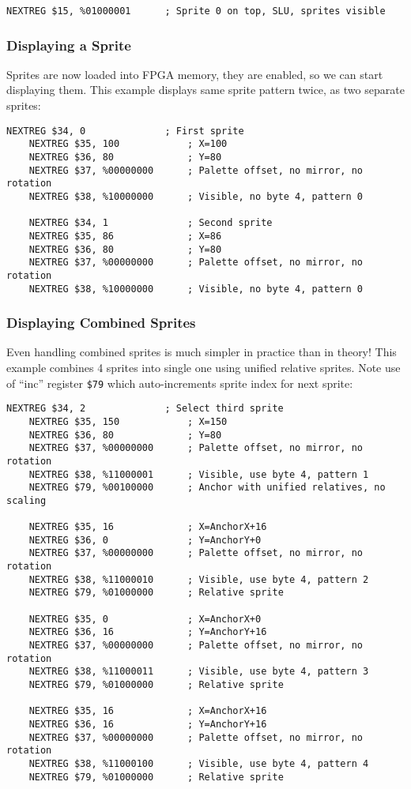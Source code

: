 \documentclass[12pt,twoside,openright,a4paper]{book}
\begin{document}
\begin{Verbatim}[gobble=1]
	NEXTREG $15, %01000001		; Sprite 0 on top, SLU, sprites visible
\end{Verbatim}


\subsubsection{Displaying a Sprite}

Sprites are now loaded into FPGA memory, they are enabled, so we can start displaying them. This example displays same sprite pattern twice, as two separate sprites:

\begin{Verbatim}[gobble=1]
	NEXTREG $34, 0              ; First sprite
	NEXTREG $35, 100            ; X=100
	NEXTREG $36, 80             ; Y=80
	NEXTREG $37, %00000000      ; Palette offset, no mirror, no rotation
	NEXTREG $38, %10000000      ; Visible, no byte 4, pattern 0

	NEXTREG $34, 1              ; Second sprite
	NEXTREG $35, 86             ; X=86
	NEXTREG $36, 80             ; Y=80
	NEXTREG $37, %00000000      ; Palette offset, no mirror, no rotation
	NEXTREG $38, %10000000      ; Visible, no byte 4, pattern 0
\end{Verbatim}


\pagebreak
\subsubsection{Displaying Combined Sprites}

Even handling combined sprites is much simpler in practice than in theory! This example combines 4 sprites into single one using unified relative sprites. Note use of ``inc'' register {\tt \$79} which auto-increments sprite index for next sprite:

\begin{Verbatim}[gobble=1]
	NEXTREG $34, 2              ; Select third sprite
	NEXTREG $35, 150            ; X=150
	NEXTREG $36, 80             ; Y=80
	NEXTREG $37, %00000000      ; Palette offset, no mirror, no rotation
	NEXTREG $38, %11000001      ; Visible, use byte 4, pattern 1
	NEXTREG $79, %00100000      ; Anchor with unified relatives, no scaling

	NEXTREG $35, 16             ; X=AnchorX+16
	NEXTREG $36, 0              ; Y=AnchorY+0
	NEXTREG $37, %00000000      ; Palette offset, no mirror, no rotation
	NEXTREG $38, %11000010      ; Visible, use byte 4, pattern 2
	NEXTREG $79, %01000000      ; Relative sprite

	NEXTREG $35, 0              ; X=AnchorX+0
	NEXTREG $36, 16             ; Y=AnchorY+16
	NEXTREG $37, %00000000      ; Palette offset, no mirror, no rotation
	NEXTREG $38, %11000011      ; Visible, use byte 4, pattern 3
	NEXTREG $79, %01000000      ; Relative sprite

	NEXTREG $35, 16             ; X=AnchorX+16
	NEXTREG $36, 16             ; Y=AnchorY+16
	NEXTREG $37, %00000000      ; Palette offset, no mirror, no rotation
	NEXTREG $38, %11000100      ; Visible, use byte 4, pattern 4
	NEXTREG $79, %01000000      ; Relative sprite
\end{Verbatim}
\end{document}
